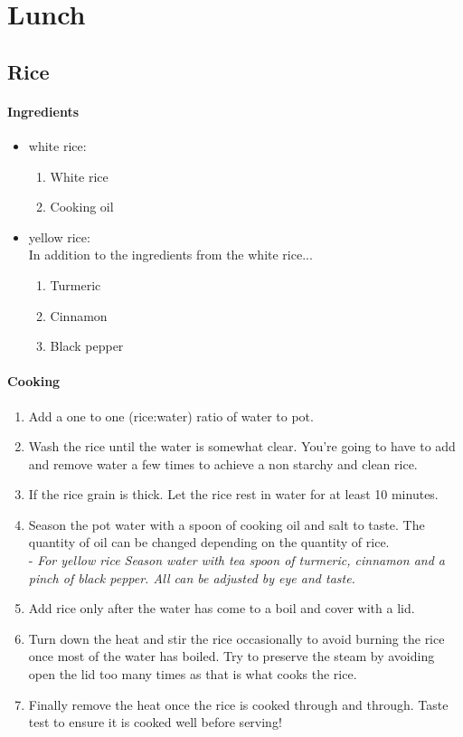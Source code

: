 \chapter{Lunch}

\section{Rice}
\subsubsection{Ingredients}
\begin{itemize}
    \item white rice:
    \begin{enumerate}
        \item White rice
        \item Cooking oil
    \end{enumerate}
    \item yellow rice:\\ In addition to the ingredients from the white rice...
    \begin{enumerate}
        \item Turmeric
        \item Cinnamon
        \item Black pepper
    \end{enumerate}
\end{itemize}

\subsubsection{Cooking}
\begin{enumerate}
    \item Add a one to one (rice:water) ratio of water to pot.
    \item Wash the rice until the water is somewhat clear. You're going to have to add and remove water a few times to achieve a non starchy and clean rice.
    \item If the rice grain is thick. Let the rice rest in water for at least 10 minutes.
    \item Season the pot water with a spoon of cooking oil and salt to taste. The quantity of oil can be changed depending on the quantity of rice.\\
        - \textit{For yellow rice Season water with tea spoon of turmeric, cinnamon and a pinch of black pepper. All can be adjusted by eye and taste.}
    \item Add rice only after the water has come to a boil and cover with a lid.
    \item Turn down the heat and stir the rice occasionally to avoid burning the rice once most of the water has boiled. Try to preserve the steam by avoiding open the lid too many times as that is what cooks the rice.
    \item Finally remove the heat once the rice is cooked through and through. Taste test to ensure it is cooked well before serving!
\end{enumerate}


